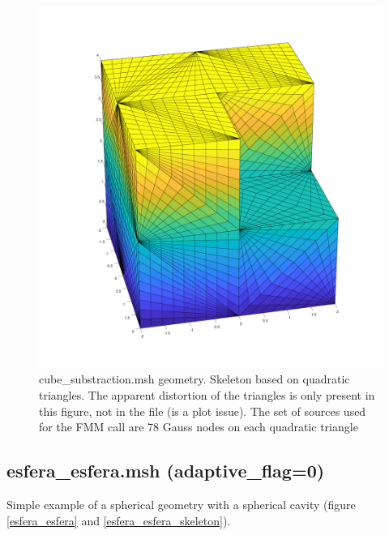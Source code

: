 \documentclass[11pt, oneside]{article}   	%
\begin{document}
\begin{figure}[H]
\begin{center}
\includegraphics[width=6in]{cube_substraction_skeleton.pdf}
\end{center}
\caption{cube\_substraction.msh geometry. Skeleton based on quadratic triangles. The apparent distortion of the triangles is only present in this figure, not in the file (is a plot issue). The set of sources used for the FMM call are 78 Gauss nodes on each quadratic triangle}
\label{cube_substraction_skeleton}
\end{figure}













\newpage
\subsection{esfera\_esfera.msh (adaptive\_flag=0)}
Simple example of a spherical geometry with a spherical cavity (figure \ref{esfera_esfera} and \ref{esfera_esfera_skeleton}).
\end{document}
